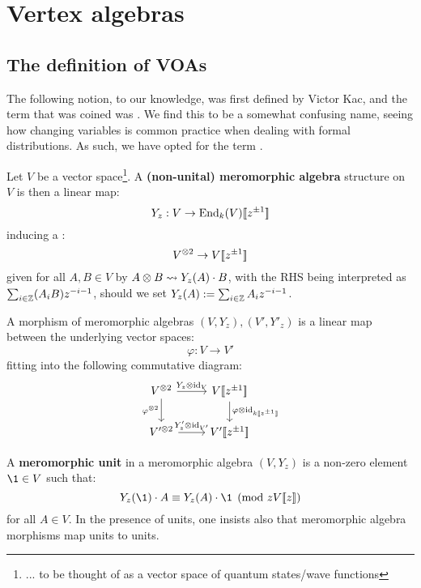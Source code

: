 \section{Vertex algebras}
    \subsection{The definition of VOAs}
        The following notion, to our knowledge, was first defined by Victor Kac, and the term that was coined was . We find this to be a somewhat confusing name, seeing how changing variables is common practice when dealing with formal distributions. As such, we have opted for the term .
        \begin{definition} \label{def: meromorphic_algebras}
            Let $V$ be a vector space\footnote{... to be thought of as a vector space of quantum states/wave functions}. A \textbf{(non-unital) meromorphic algebra} structure on $V$ is then a linear map:
                $$Y_z: V \to \operatorname{End}_k(V)[\![z^{\pm 1}]\!]$$
            inducing a :
                $$V^{\tensor 2} \to V[\![z^{\pm 1}]\!]$$
            given for all $A, B \in V$ by $A \tensor B \mapsto Y_z(A) \cdot B$, with the RHS being interpreted as $\sum_{i \in \mathbb{Z}} (A_i B) z^{- i - 1}$, should we set $Y_z(A) := \sum_{i \in \mathbb{Z}} A_i z^{-i - 1}$.

            A morphism of meromorphic algebras $(V, Y_z), (V', Y'_z)$ is a linear map between the underlying vector spaces:
                $$\varphi: V \to V'$$
            fitting into the following commutative diagram:
                $$
                    \begin{tikzcd}
                	{V^{\tensor 2}} & {V[\![z^{\pm 1}]\!]} \\
                	{V'^{\tensor 2}} & {V'[\![z^{\pm 1}]\!]}
                	\arrow["{Y_z \tensor \id_V}", from=1-1, to=1-2]
                	\arrow["{\varphi^{\tensor 2}}"', from=1-1, to=2-1]
                	\arrow["{\varphi \tensor \id_{k[\![z^{\pm 1}]\!]}}", from=1-2, to=2-2]
                	\arrow["{Y'_z \tensor \id_{V'}}", from=2-1, to=2-2]
                    \end{tikzcd}
                $$

            A \textbf{meromorphic unit} in a meromorphic algebra $(V, Y_z)$ is a non-zero element $\1 \in V$ such that:
                $$Y_z(\1) \cdot A \equiv Y_z(A) \cdot \1 \pmod{z V[\![z]\!]}$$
            for all $A \in V$. In the presence of units, one insists also that meromorphic algebra morphisms map units to units.
        \end{definition}
